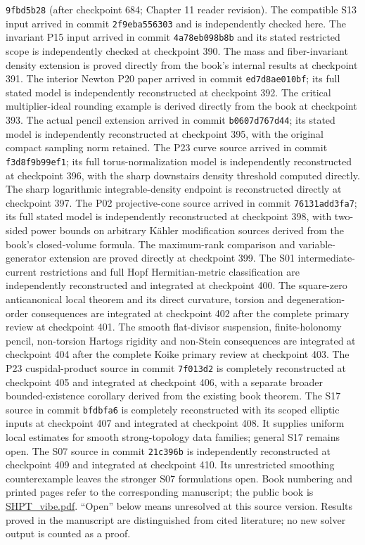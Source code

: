 \documentclass[11pt]{article}
\begin{document}
\texttt{9fbd5b28} (after checkpoint 684; Chapter 11 reader revision). The compatible S13 input arrived in commit \texttt{2f9eba556303} and is independently checked here. The invariant P15 input arrived in commit \texttt{4a78eb098b8b} and its stated restricted scope is independently checked at checkpoint 390. The mass and fiber-invariant density extension is proved directly from the book's internal results at checkpoint 391. The interior Newton P20 paper arrived in commit \texttt{ed7d8ae010bf}; its full stated model is independently reconstructed at checkpoint 392. The critical multiplier-ideal rounding example is derived directly from the book at checkpoint 393. The actual pencil extension arrived in commit \texttt{b0607d767d44}; its stated model is independently reconstructed at checkpoint 395, with the original compact sampling norm retained. The P23 curve source arrived in commit \texttt{f3d8f9b99ef1}; its full torus-normalization model is independently reconstructed at checkpoint 396, with the sharp downstairs density threshold computed directly. The sharp logarithmic integrable-density endpoint is reconstructed directly at checkpoint 397. The P02 projective-cone source arrived in commit \texttt{76131add3fa7}; its full stated model is independently reconstructed at checkpoint 398, with two-sided power bounds on arbitrary K\"ahler modification sources derived from the book's closed-volume formula. The maximum-rank comparison and variable-generator extension are proved directly at checkpoint 399. The S01 intermediate-current restrictions and full Hopf Hermitian-metric classification are independently reconstructed and integrated at checkpoint 400. The square-zero anticanonical local theorem and its direct curvature, torsion and degeneration-order consequences are integrated at checkpoint 402 after the complete primary review at checkpoint 401. The smooth flat-divisor suspension, finite-holonomy pencil, non-torsion Hartogs rigidity and non-Stein consequences are integrated at checkpoint 404 after the complete Koike primary review at checkpoint 403. The P23 cuspidal-product source in commit \texttt{7f013d2} is completely reconstructed at checkpoint 405 and integrated at checkpoint 406, with a separate broader bounded-existence corollary derived from the existing book theorem. The S17 source in commit \texttt{bfdbfa6} is completely reconstructed with its scoped elliptic inputs at checkpoint 407 and integrated at checkpoint 408. It supplies uniform local estimates for smooth strong-topology data families; general S17 remains open. The S07 source in commit \texttt{21c396b} is independently reconstructed at checkpoint 409 and integrated at checkpoint 410. Its unrestricted smoothing counterexample leaves the stronger S07 formulations open.
Book numbering and printed pages refer to the corresponding manuscript; the public book is
\href{https://mingchenxia.github.io/Papers/SHPT_vibe.pdf}{SHPT\_vibe.pdf}.
``Open'' below means unresolved at this source version. Results proved in the manuscript are distinguished from cited literature; no new solver output is counted as a proof.
\tableofcontents
\end{document}

